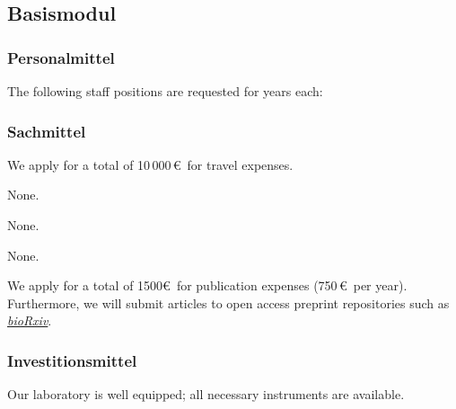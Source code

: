 \documentclass[ngerman]{scrartcl}
\begin{document}
\subsection{Basismodul}

\subsubsection{Personalmittel}
\begin{funds}
The following staff positions are requested for  years each:


\end{funds}


\subsubsection{Sachmittel}
\begin{funds}



We apply for a total of 10\,000\,\euro\ for travel expenses.

None.

None.

None.

We apply for a total of 1500\euro\ for publication expenses (750\,\euro\ per
year). Furthermore, we will submit articles to open access preprint repositories
such as \href{https://www.biorxiv.org/}{\textit{bioRxiv}}.

\end{funds}

\subsubsection{Investitionsmittel}

Our laboratory is well equipped; all necessary instruments are available.
\end{document}
